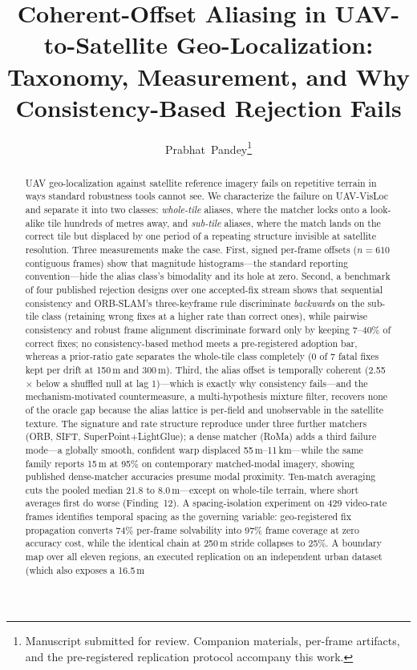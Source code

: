 \documentclass[journal]{IEEEtran}
\begin{document}
\title{Coherent-Offset Aliasing in UAV-to-Satellite Geo-Localization:\\ Taxonomy, Measurement, and Why Consistency-Based Rejection Fails}

\author{Prabhat~Pandey\thanks{Manuscript submitted for review. Companion materials, per-frame artifacts, and the pre-registered replication protocol accompany this work.}}


\maketitle

\begin{abstract}
UAV geo-localization against satellite reference imagery fails on repetitive terrain in ways standard robustness tools cannot see. We characterize the failure on UAV-VisLoc and separate it into two classes: \emph{whole-tile} aliases, where the matcher locks onto a look-alike tile hundreds of metres away, and \emph{sub-tile} aliases, where the match lands on the correct tile but displaced by one period of a repeating structure invisible at satellite resolution. Three measurements make the case. First, signed per-frame offsets ($n=610$ contiguous frames) show that magnitude histograms---the standard reporting convention---hide the alias class's bimodality and its hole at zero. Second, a benchmark of four published rejection designs over one accepted-fix stream shows that sequential consistency and ORB-SLAM's three-keyframe rule discriminate \emph{backwards} on the sub-tile class (retaining wrong fixes at a higher rate than correct ones), while pairwise consistency and robust frame alignment discriminate forward only by keeping 7--40\% of correct fixes; no consistency-based method meets a pre-registered adoption bar, whereas a prior-ratio gate separates the whole-tile class completely (0 of 7 fatal fixes kept per drift at 150\,m and 300\,m). Third, the alias offset is temporally coherent (2.55$\times$ below a shuffled null at lag 1)---which is exactly why consistency fails---and the mechanism-motivated countermeasure, a multi-hypothesis mixture filter, recovers none of the oracle gap because the alias lattice is per-field and unobservable in the satellite texture. The signature and rate structure reproduce under three further matchers (ORB, SIFT, SuperPoint+LightGlue); a dense matcher (RoMa) adds a third failure mode---a globally smooth, confident warp displaced 55\,m--11\,km---while the same family reports 15\,m at 95\% on contemporary matched-modal imagery, showing published dense-matcher accuracies presume modal proximity. Ten-match averaging cuts the pooled median 21.8 to 8.0\,m---except on whole-tile terrain, where short averages first do worse (Finding~12). A spacing-isolation experiment on 429 video-rate frames identifies temporal spacing as the governing variable: geo-registered fix propagation converts 74\% per-frame solvability into 97\% frame coverage at zero accuracy cost, while the identical chain at 250\,m stride collapses to 25\%. A boundary map over all eleven regions, an executed replication on an independent urban dataset (which also exposes a 16.5\,m 
\end{abstract}
\end{document}
